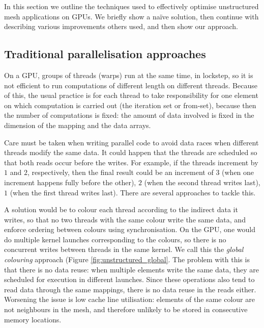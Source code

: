 In this section we outline the techniques used to effectively optimise
unstructured mesh applications on GPUs. We briefly show a naïve solution, then
continue with describing various improvements others used, and then show our
approach.

\subsection{Traditional parallelisation approaches}

On a GPU, groups of threads (warps) run at the same time, in lockstep, so it is
not efficient to run computations of different length on different threads.
Because of this, the usual practice is for each thread to take responsibility
for one element on which computation is carried out (the iteration set or
from-set), because then the number of computations is fixed: the amount of data
involved is fixed in the dimension of the mapping and the data arrays.

Care must be taken when writing parallel code to avoid data races when different
threads modify the same data. It could happen that the threads are scheduled so
that both reads occur before the writes. For example, if the threads increment
by $1$ and $2$, respectively, then the final result could be an increment of $3$
(when one increment happens fully before the other), $2$ (when the second thread
writes last), $1$ (when the first thread writes last). There are several
approaches to tackle this.

A solution would be to colour each thread according to the indirect data it
writes, so that no two threads with the same colour write the same data, and
enforce ordering between colours using synchronisation. On the GPU, one would do
multiple kernel launches corresponding to the colours, so there is no concurrent
writes between threads in the same kernel. We call this the \emph{global
colouring} approach (Figure \ref{fig:unstructured_global}. The problem with this
is that there is no data reuse: when multiple elements write the same data, they
are scheduled for execution in different launches. Since these operations also
tend to read data through the same mappings, there is no data reuse in the reads
either. Worsening the issue is low cache line utilisation: elements of the same
colour are not neighbours in the mesh, and therefore unlikely to be stored in
consecutive memory locations.


